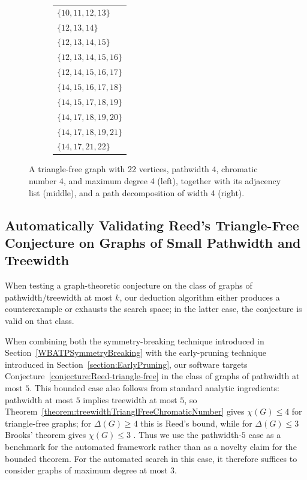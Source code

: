 \documentclass[11pt,a4paper]{article}
\newcommand{\treewidthvalue}{k}
\newcommand{\maxDegree}{\Delta}
\newcommand{\chromaticnumber}{\chi}
\newcommand{\agraph}{G}
\begin{document}
\begin{figure}[H]
\begin{subfigure}{0.3\textwidth}
{\begin{tabular}{@{}l@{}}
	$\{10,11,12,13\}$ \\
	$\{12,13,14\}$ \\
	$\{12,13,14,15\}$ \\
	$\{12,13,14,15,16\}$ \\
	$\{12,14,15,16,17\}$ \\
	$\{14,15,16,17,18\}$ \\
	$\{14,15,17,18,19\}$ \\
	$\{14,17,18,19,20\}$ \\
	$\{14,17,18,19,21\}$ \\
	$\{14,17,21,22\}$ \\
	\end{tabular}}
	\end{subfigure}
\caption{A triangle-free graph with 22 vertices, pathwidth $4$, chromatic number 4, and maximum degree 4 (left), together with its adjacency list (middle), and a path decomposition of width 4 (right).
}
\label{fig:counterexample-graph-triangle-free-22-vertices}
\end{figure}












\subsection{Automatically Validating Reed's Triangle-Free Conjecture on Graphs of Small Pathwidth and Treewidth}

When testing a graph-theoretic conjecture on the class of graphs of pathwidth/treewidth at most $\treewidthvalue$, our deduction algorithm either produces a counterexample or exhausts the search space; in the latter case, the conjecture is valid on that class.

When combining both the symmetry-breaking technique introduced in Section~\ref{WBATPSymmetryBreaking} with the early-pruning technique introduced in Section~\ref{section:EarlyPruning}, our software targets Conjecture~\ref{conjecture:Reed-triangle-free} in the class of graphs of pathwidth at most $5$. This bounded case also follows from standard analytic ingredients: pathwidth at most $5$ implies treewidth at most $5$, so Theorem~\ref{theorem:treewidthTrianglFreeChromaticNumber} gives $\chromaticnumber(\agraph)\le 4$ for triangle-free graphs; for $\maxDegree(\agraph)\ge 4$ this is Reed's bound, while for $\maxDegree(\agraph)\le 3$ Brooks' theorem gives $\chromaticnumber(\agraph)\le 3$ \cite{Brooks1941}. Thus we use the pathwidth-$5$ case as a benchmark for the automated framework rather than as a novelty claim for the bounded theorem.
For the automated search in this case, it therefore suffices to consider graphs of maximum degree at most $3$.
\end{document}
